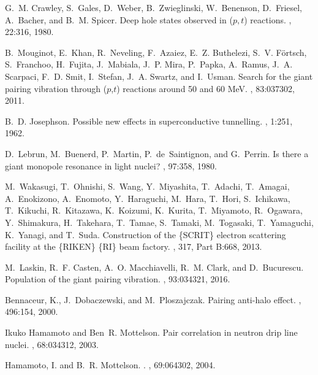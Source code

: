 \documentclass[a4paper,11pt]{article}
\numberwithin{equation}{section}
\numberwithin{figure}{section}
\numberwithin{table}{section}
\begin{document}
\begin{thebibliography}{10}
	G.~M. Crawley, S.~Gales, D.~Weber, B.~Zwieglinski, W.~Benenson, D.~Friesel,
	A.~Bacher, and B.~M. Spicer.
	\newblock Deep hole states observed in ($p, t$) reactions.
	, 22:316, 1980.
	
	B.~Mouginot, E.~Khan, R.~Neveling, F.~Azaiez, E.~Z. Buthelezi, S.~V. F\"ortsch,
	S.~Franchoo, H.~Fujita, J.~Mabiala, J.~P. Mira, P.~Papka, A.~Ramus, J.~A.
	Scarpaci, F.~D. Smit, I.~Stefan, J.~A. Swartz, and I.~Usman.
	\newblock Search for the giant pairing vibration through ($p$,$t$) reactions
	around 50 and 60 {MeV}.
	, 83:037302, 2011.
	
	B.~D. Josephson.
	\newblock Possible new effects in superconductive tunnelling.
	, 1:251, 1962.
	
	D.~Lebrun, M.~Buenerd, P.~Martin, P.~de~Saintignon, and G.~Perrin.
	\newblock Is there a giant monopole resonance in light nuclei?
	, 97:358, 1980.
	
	M.~Wakasugi, T.~Ohnishi, S.~Wang, Y.~Miyashita, T.~Adachi, T.~Amagai,
	A.~Enokizono, A.~Enomoto, Y.~Haraguchi, M.~Hara, T.~Hori, S.~Ichikawa,
	T.~Kikuchi, R.~Kitazawa, K.~Koizumi, K.~Kurita, T.~Miyamoto, R.~Ogawara,
	Y.~Shimakura, H.~Takehara, T.~Tamae, S.~Tamaki, M.~Togasaki, T.~Yamaguchi,
	K.~Yanagi, and T.~Suda.
	\newblock Construction of the \{SCRIT\} electron scattering facility at the
	\{RIKEN\} \{RI\} beam factory.
	, 317, Part B:668, 2013.
	
	M.~Laskin, R.~F. Casten, A.~O. Macchiavelli, R.~M. Clark, and D.~Bucurescu.
	\newblock Population of the giant pairing vibration.
	, 93:034321, 2016.
	
	{Bennaceur, K.}, J.~Dobaczewski, and M.~Ploszajczak.
	\newblock Pairing anti-halo effect.
	, 496:154, 2000.
	
	Ikuko Hamamoto and Ben~R. Mottelson.
	\newblock Pair correlation in neutron drip line nuclei.
	, 68:034312, 2003.
	
	{Hamamoto, I.} and B.~R. Mottelson.
	.
	, 69:064302, 2004.
	

\end{thebibliography}
\end{document}
